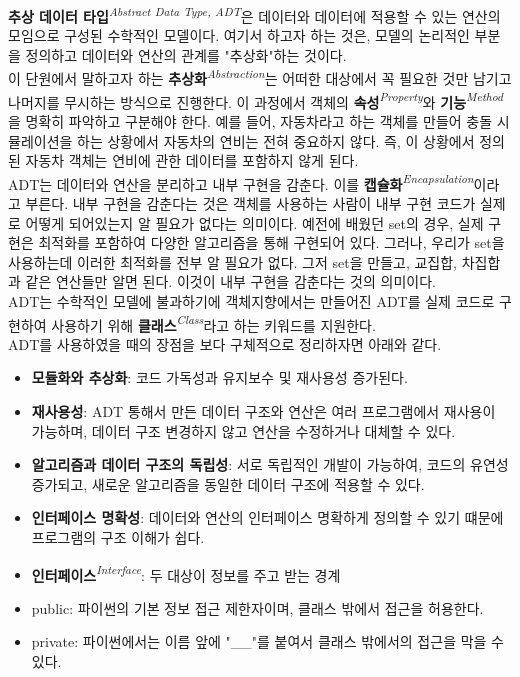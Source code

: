 \textbf{추상 데이터 타입}\textit{\textsuperscript{Abstract Data Type, ADT}}은 데이터와 데이터에 적용할 수 있는 연산의 모임으로 구성된 수학적인 모델이다. 여기서 하고자 하는 것은, 모델의 논리적인 부분을 정의하고 데이터와 연산의 관계를 "추상화"하는 것이다.\\
이 단원에서 말하고자 하는 \textbf{추상화}\textit{\textsuperscript{Abstraction}}는 어떠한 대상에서 꼭 필요한 것만 남기고 나머지를 무시하는 방식으로 진행한다. 이 과정에서 객체의 \textbf{속성}\textit{\textsuperscript{Property}}와 \textbf{기능}\textit{\textsuperscript{Method}}을 명확히 파악하고 구분해야 한다. 예를 들어, 자동차라고 하는 객체를 만들어 충돌 시뮬레이션을 하는 상황에서 자동차의 연비는 전혀 중요하지 않다. 즉, 이 상황에서 정의된 자동차 객체는 연비에 관한 데이터를 포함하지 않게 된다.\\
ADT는 데이터와 연산을 분리하고 내부 구현을 감춘다. 이를 \textbf{캡슐화}\textit{\textsuperscript{Encapsulation}}이라고 부른다. 내부 구현을 감춘다는 것은 객체를 사용하는 사람이 내부 구현 코드가 실제로 어떻게 되어있는지 알 필요가 없다는 의미이다. 예전에 배웠던 set의 경우, 실제 구현은 최적화를 포함하여 다양한 알고리즘을 통해 구현되어 있다. 그러나, 우리가 set을 사용하는데 이러한 최적화를 전부 알 필요가 없다. 그저 set을 만들고, 교집합, 차집합과 같은 연산들만 알면 된다. 이것이 내부 구현을 감춘다는 것의 의미이다.\\
ADT는 수학적인 모델에 불과하기에 객체지향에서는 만들어진 ADT를 실제 코드로 구현하여 사용하기 위해 \textbf{클래스}\textit{\textsuperscript{Class}}라고 하는 키워드를 지원한다.\\
ADT를 사용하였을 때의 장점을 보다 구체적으로 정리하자면 아래와 같다.
\begin{itemize}
\item \textbf{모듈화와 추상화}: 코드 가독성과 유지보수 및 재사용성 증가된다.
\item \textbf{재사용성}: ADT 통해서 만든 데이터 구조와 연산은 여러 프로그램에서 재사용이 가능하며, 데이터 구조 변경하지 않고 연산을 수정하거나 대체할 수 있다.
\item \textbf{알고리즘과 데이터 구조의 독립성}: 서로 독립적인 개발이 가능하여, 코드의 유연성 증가되고, 새로운 알고리즘을 동일한 데이터 구조에 적용할 수 있다.
\item \textbf{인터페이스 명확성}: 데이터와 연산의 인터페이스 명확하게 정의할 수 있기 떄문에 프로그램의 구조 이해가 쉽다.
\item \textbf{인터페이스}\textit{\textsuperscript{Interface}}: 두 대상이 정보를 주고 받는 경계
\item public: 파이썬의 기본 정보 접근 제한자이며, 클래스 밖에서 접근을 허용한다.
\item private: 파이썬에서는 이름 앞에 "\_\_"를 붙여서 클래스 밖에서의 접근을 막을 수 있다.
\end{itemize}

